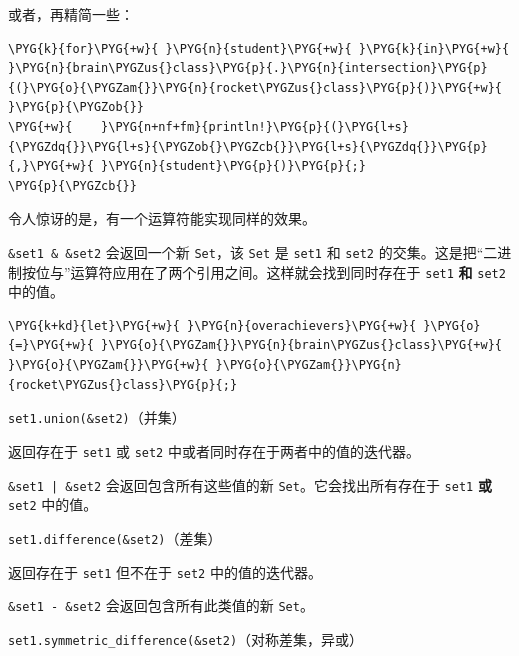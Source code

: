 或者，再精简一些：

\begin{Verbatim}[commandchars=\\\{\},breaklines=true,breakanywhere=true,fontsize=\codefont,xleftmargin=17bp]
\PYG{k}{for}\PYG{+w}{ }\PYG{n}{student}\PYG{+w}{ }\PYG{k}{in}\PYG{+w}{ }\PYG{n}{brain\PYGZus{}class}\PYG{p}{.}\PYG{n}{intersection}\PYG{p}{(}\PYG{o}{\PYGZam{}}\PYG{n}{rocket\PYGZus{}class}\PYG{p}{)}\PYG{+w}{ }\PYG{p}{\PYGZob{}}
\PYG{+w}{    }\PYG{n+nf+fm}{println!}\PYG{p}{(}\PYG{l+s}{\PYGZdq{}}\PYG{l+s}{\PYGZob{}\PYGZcb{}}\PYG{l+s}{\PYGZdq{}}\PYG{p}{,}\PYG{+w}{ }\PYG{n}{student}\PYG{p}{)}\PYG{p}{;}
\PYG{p}{\PYGZcb{}}
\end{Verbatim}

令人惊讶的是，有一个运算符能实现同样的效果。

\texttt{\&set1 \& \&set2} 会返回一个新 \texttt{Set}，该 \texttt{Set} 是 \texttt{set1} 和 \texttt{set2} 的交集。这是把“二进制按位与”运算符应用在了两个引用之间。这样就会找到同时存在于 \texttt{set1} \textbf{和} \texttt{set2} 中的值。

\begin{Verbatim}[commandchars=\\\{\},breaklines=true,breakanywhere=true,fontsize=\codefont,xleftmargin=17bp]
\PYG{k+kd}{let}\PYG{+w}{ }\PYG{n}{overachievers}\PYG{+w}{ }\PYG{o}{=}\PYG{+w}{ }\PYG{o}{\PYGZam{}}\PYG{n}{brain\PYGZus{}class}\PYG{+w}{ }\PYG{o}{\PYGZam{}}\PYG{+w}{ }\PYG{o}{\PYGZam{}}\PYG{n}{rocket\PYGZus{}class}\PYG{p}{;}
\end{Verbatim}

\begin{mySidenote}
\texttt{set1.union(\&set2)}（并集）
\end{mySidenote}

返回存在于 \texttt{set1} 或 \texttt{set2} 中或者同时存在于两者中的值的迭代器。

\texttt{\&set1 | \&set2} 会返回包含所有这些值的新 \texttt{Set}。它会找出所有存在于 \texttt{set1} \textbf{或} \texttt{set2} 中的值。

\begin{mySidenote}
\texttt{set1.difference(\&set2)}（差集）
\end{mySidenote}

返回存在于 \texttt{set1} 但不在于 \texttt{set2} 中的值的迭代器。

\texttt{\&set1 - \&set2} 会返回包含所有此类值的新 \texttt{Set}。

\begin{myNote}
\texttt{set1.symmetric\_difference(\&set2)}（对称差集，异或）
\end{myNote}

